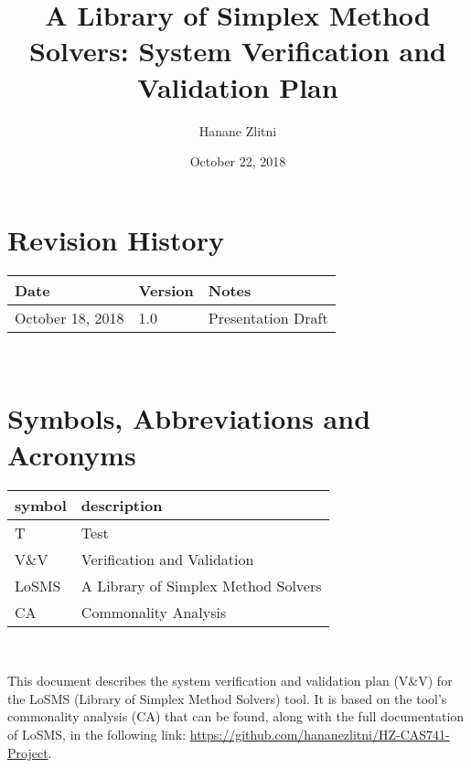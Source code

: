 \documentclass[12pt, titlepage]{article}
\newcommand{\famname}{LoSMS} %
\begin{document}
\title{A Library of Simplex Method Solvers: System Verification and Validation 
Plan} 
\author{Hanane Zlitni}
\date{October 22, 2018}
	
\maketitle


\section{Revision History}

\begin{tabularx}{\textwidth}{p{3cm}p{2cm}X}
\toprule {\bf Date} & {\bf Version} & {\bf Notes}\\
\midrule
October 18, 2018 & 1.0 & Presentation Draft\\
\bottomrule
\end{tabularx}

~\newpage

\section{Symbols, Abbreviations and Acronyms}

\renewcommand{\arraystretch}{1.2}
\begin{tabular}{l l} 
  \toprule		
  \textbf{symbol} & \textbf{description}\\
  \midrule 
  T & Test\\
  V\&V & Verification and Validation\\
  \famname{} & A Library of Simplex Method Solvers\\
  CA & Commonality Analysis\\
  \bottomrule
\end{tabular}\\


\newpage

\tableofcontents

\listoftables

\listoffigures

\newpage


This document describes the system verification and validation plan (V\&V) for 
the \famname{} (Library of Simplex Method Solvers) tool. It is based on the 
tool's commonality analysis (CA) that can be found, along with the full 
documentation of \famname{}, in the following link:  
\url{https://github.com/hananezlitni/HZ-CAS741-Project}.
\end{document}
